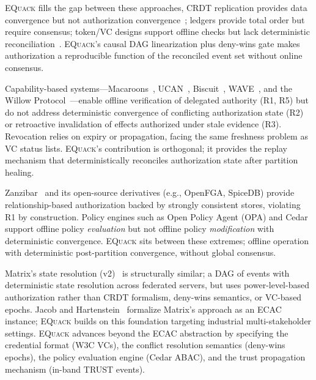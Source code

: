 \documentclass[10pt,journal,compsoc]{IEEEtran}
\newcommand{\equack}{\textsc{EQuack}}
\begin{document}
\equack{} fills the gap between these approaches, CRDT replication provides data convergence but not authorization convergence~\cite{shapiro2011crdt,gomes2017_sec}; ledgers provide total order but require consensus; token/VC designs support offline checks but lack deterministic reconciliation~\cite{rouhani2021distributed}. \equack{}'s causal DAG linearization plus deny-wins gate makes authorization a reproducible function of the reconciled event set without online consensus.

Capability-based systems---Macaroons~\cite{birgisson2014macaroons}, UCAN~\cite{ucan2022}, Biscuit~\cite{biscuit2023}, WAVE~\cite{andersen2019wave}, and the Willow Protocol~\cite{willow2024}---enable offline verification of delegated authority (R1, R5) but do not address deterministic convergence of conflicting authorization state (R2) or retroactive invalidation of effects authorized under stale evidence (R3). Revocation relies on expiry or propagation, facing the same freshness problem as VC status lists. \equack{}'s contribution is orthogonal; it provides the replay mechanism that deterministically reconciles authorization state after partition healing.

Zanzibar~\cite{zanzibar2019} and its open-source derivatives (e.g., OpenFGA, SpiceDB) provide relationship-based authorization backed by strongly consistent stores, violating R1 by construction. Policy engines such as Open Policy Agent (OPA) and Cedar~\cite{cutler2024cedar} support offline policy \emph{evaluation} but not offline policy \emph{modification} with deterministic convergence. \equack{} sits between these extremes; offline operation with deterministic post-partition convergence, without global consensus.

Matrix's state resolution (v2)~\cite{matrix_stateresv2} is structurally similar; a DAG of events with deterministic state resolution across federated servers, but uses power-level-based authorization rather than CRDT formalism, deny-wins semantics, or VC-based epochs. Jacob and Hartenstein~\cite{jacob2024eventuallyac} formalize Matrix's approach as an ECAC instance; \equack{} builds on this foundation targeting industrial multi-stakeholder settings. \equack{} advances beyond the ECAC abstraction by specifying the credential format (W3C VCs), the conflict resolution semantics (deny-wins epochs), the policy evaluation engine (Cedar ABAC), and the trust propagation mechanism (in-band TRUST events).
\end{document}
